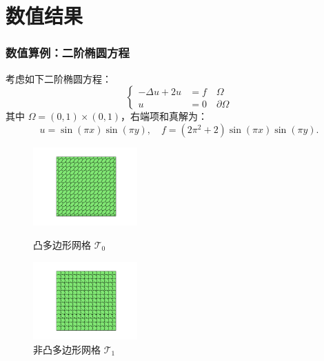 \documentclass[notheorems,serif]{beamer}
\begin{document}
\section{数值结果}
\begin{frame}
\frametitle{数值算例：二阶椭圆方程}
考虑如下二阶椭圆方程：
$$
\left\{
\begin{aligned}
    -\Delta u + 2u & = f \quad \Omega\\
    u & = 0 \quad \partial\Omega
\end{aligned}
\right.
$$
其中 $\Omega = (0, 1)\times(0, 1)$，右端项和真解为：
$$
u = \sin(\pi x)\sin(\pi y), \quad f = (2\pi^2+2)\sin(\pi x)\sin(\pi y).
$$

\begin{figure}[htb p]
\centering
\begin{minipage}[t]{0.49\linewidth}
\centering
\includegraphics[width=4cm]{../figures/convex.pdf}
\caption{凸多边形网格 $\mathcal T_0$}
\end{minipage}%
\begin{minipage}[t]{0.49\linewidth}
\centering
\includegraphics[width=4cm]{../figures/nonconvex.pdf}
\caption{非凸多边形网格 $\mathcal T_1$}
\end{minipage}%
\centering
\end{figure}
\end{frame}
\end{document}
